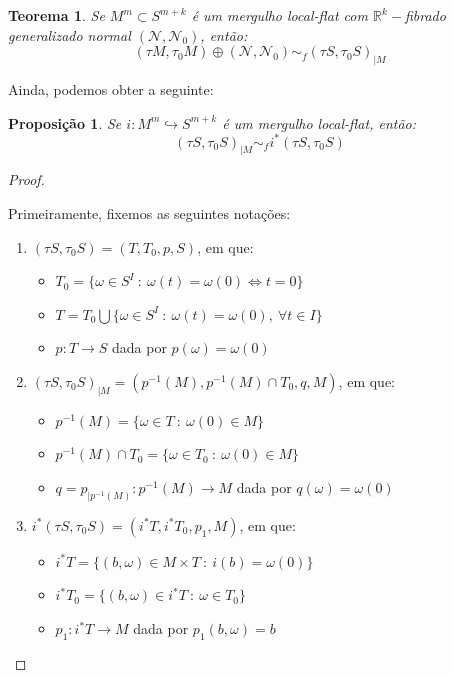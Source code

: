 \documentclass[12pt,oneside]{book} %
\newtheorem{teo}    {\hspace{0.5cm}Teorema}[chapter]
\newtheorem{prop}   {\hspace{0.5cm}Proposi\c c\~ao}[chapter]
\newcommand{\R}{\mathbb{R}}
\begin{document}
\begin{teo}\label{iso_merg_lf_1}
	Se $M^{m}\subset S^{m+k}$ é um mergulho local-flat com $\R^{k}-$fibrado generalizado normal $(\mathcal{N},\mathcal{N}_{0})$, então:
	$$ (\tau M,\tau_{0}M)\oplus (\mathcal{N},\mathcal{N}_{0})\sim_{f} (\tau S,\tau_{0}S)_{|M} $$
\end{teo}

\par Ainda, podemos obter a seguinte:

\begin{prop}\label{iso_merg_lf_2}
	Se $i:M^{m}\hookrightarrow S^{m+k}$ é um mergulho local-flat, então:
	$$ (\tau S,\tau_{0}S)_{|M}\sim_{f} i^{*}(\tau S,\tau_{0}S) $$
\end{prop}
\begin{proof}
	
	\
	
	\par Primeiramente, fixemos as seguintes notações:
	
	\begin{enumerate}
		\item $(\tau S,\tau_{0}S)=(T,T_{0},p,S)$, em que:
		\begin{itemize}
			\item $T_{0}=\{ \omega\in S^{I} \ : \ \omega(t)=\omega(0) \Leftrightarrow t=0 \}$
			\item $T=T_{0}\bigcup \{ \omega\in S^{I} \ : \ \omega(t)=\omega(0), \ \forall t\in I \}$
			\item $p:T\to S$ dada por $p(\omega)=\omega(0)$
		\end{itemize}
		\item $(\tau S,\tau_{0}S)_{|M}=(p^{-1}(M),p^{-1}(M)\cap T_{0},q,M)$, em que:
		\begin{itemize}
			\item $p^{-1}(M)=\{ \omega\in T \ : \ \omega(0)\in M \}$
			\item $p^{-1}(M)\cap T_{0}=\{ \omega\in T_{0} \ : \ \omega(0)\in M \}$
			\item $q=p_{|p^{-1}(M)}:p^{-1}(M)\to M$ dada por $q(\omega)=\omega(0)$
		\end{itemize}
		\item $i^{*}(\tau S,\tau_{0}S)=(i^{*}T,i^{*}T_{0},p_{1},M)$, em que:
		\begin{itemize}
			\item $i^{*}T=\{ (b,\omega)\in M\times T \ : \ i(b)=\omega(0) \}$
			\item $i^{*}T_{0}=\{ (b,\omega)\in i^{*}T \ : \ \omega\in T_{0} \}$
			\item  $p_{1}:i^{*}T\to M$ dada por $p_{1}(b,\omega)=b$
		\end{itemize}
	\end{enumerate}
	

\end{proof}
\end{document}
